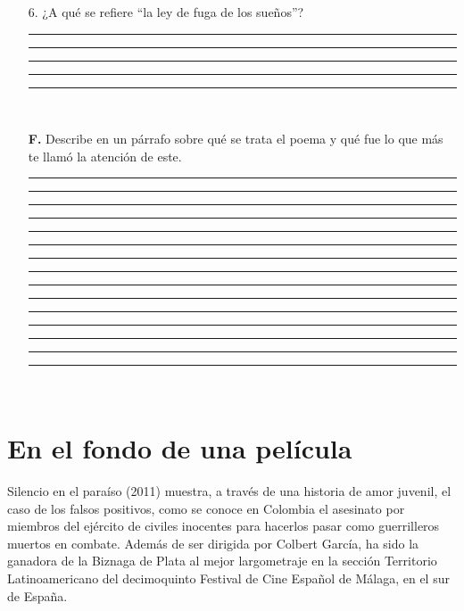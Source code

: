 \documentclass[11pt,fleqn,twocolumn]{book} %
\begin{document}
\begin{exercise}
\begin{itemize}
\rule[-0.2mm]{64mm}{0.1mm}
\rule[-0.2mm]{64mm}{0.1mm}
\rule[-0.2mm]{64mm}{0.1mm}
\rule[-0.2mm]{64mm}{0.1mm}
\rule[-0.2mm]{64mm}{0.1mm} \\
\item[6.] ¿A qué se refiere “la ley de fuga de los sueños”?  \\
\rule[-0.2mm]{64mm}{0.1mm}
\rule[-0.2mm]{64mm}{0.1mm}
\rule[-0.2mm]{64mm}{0.1mm}
\rule[-0.2mm]{64mm}{0.1mm}
\rule[-0.2mm]{64mm}{0.1mm} \\
\item[\textbf{F.}] Describe en un párrafo sobre qué se trata el poema y qué fue lo que más te llamó la atención de este. \\
\rule[-0.2mm]{64mm}{0.1mm}
\rule[-0.2mm]{64mm}{0.1mm}
\rule[-0.2mm]{64mm}{0.1mm}
\rule[-0.2mm]{64mm}{0.1mm}
\rule[-0.2mm]{64mm}{0.1mm}
\rule[-0.2mm]{64mm}{0.1mm}
\rule[-0.2mm]{64mm}{0.1mm}
\rule[-0.2mm]{64mm}{0.1mm}
\rule[-0.2mm]{64mm}{0.1mm}
\rule[-0.2mm]{64mm}{0.1mm}
\rule[-0.2mm]{64mm}{0.1mm}
\rule[-0.2mm]{64mm}{0.1mm}
\rule[-0.2mm]{64mm}{0.1mm}
\rule[-0.2mm]{64mm}{0.1mm}
\rule[-0.2mm]{64mm}{0.1mm} \\
\end{itemize}
\end{exercise}
  \vspace{2em}
  

\section{En el fondo de una película}
\begin{definition}
Silencio en el paraíso (2011) muestra, a través de una historia de amor juvenil, el caso de los falsos positivos, como se conoce en Colombia el asesinato por miembros del ejército de civiles inocentes para hacerlos pasar como guerrilleros muertos en combate. Además de ser dirigida por Colbert García, ha sido la ganadora de la Biznaga de Plata al mejor largometraje en la sección Territorio Latinoamericano del decimoquinto Festival de Cine Español de Málaga, en el sur de España. 
\end{definition}
\end{document}

